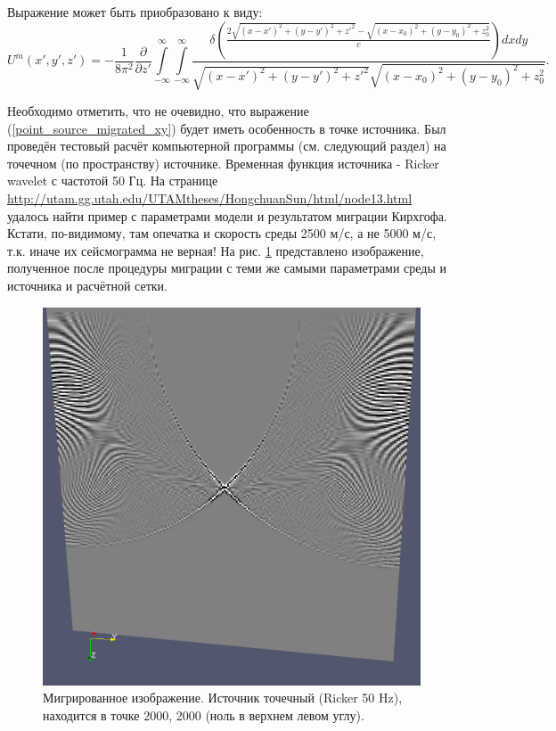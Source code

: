 \documentclass{article}
\begin{document}
Выражение может быть приобразовано к виду:
\begin{equation}
\label{point_source_migrated_xy}
U^m(x',y',z') = -\frac{1}{8\pi^2}\frac{\partial}{\partial z'} \int\limits_{-\infty}^{\infty} \int\limits_{-\infty}^{\infty} \frac{\delta(\frac{2\sqrt{(x-x')^2 + (y-y')^2 + z'^2} - \sqrt{(x-x_0)^2 + (y-y_0)^2 + z_0^2}}{c})dxdy}{\sqrt{(x-x')^2 + (y-y')^2 + z'^2}\sqrt{(x-x_0)^2 + (y-y_0)^2 + z_0^2}}.
\end{equation}

Необходимо отметить, что не очевидно, что выражение (\ref{point_source_migrated_xy}) будет иметь особенность в точке источника.
Был проведён тестовый расчёт компьютерной программы (см. следующий раздел) на точечном (по пространству) источнике.
Временная функция источника - Ricker wavelet с частотой 50 Гц.
На странице \url{http://utam.gg.utah.edu/UTAMtheses/HongchuanSun/html/node13.html} удалось найти пример с параметрами модели и результатом миграции Кирхгофа.
Кстати, по-видимому, там опечатка и скорость среды 2500 м/с, а не 5000 м/с, т.к. иначе их сейсмограмма не верная!
На рис. \ref{comparison_1} представлено изображение, полученное после процедуры миграции с теми же самыми параметрами среды и источника и расчётной сетки.
\begin{figure}[ht]
  \center
  \includegraphics[scale=0.2]{pic/point_source_2000_2000.png}
  \caption{Мигрированное изображение. Источник точечный (Ricker 50 Hz), находится в точке 2000, 2000 (ноль в верхнем левом углу).}
\label{comparison_1}
\end{figure}
\end{document}
